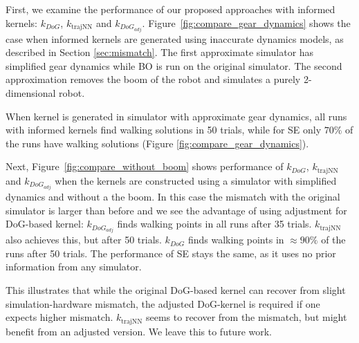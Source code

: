 First, we examine the performance of our proposed approaches with informed kernels: $k_{DoG}$, $k_{\text{trajNN}}$ and $k_{DoG_{adj}}$. Figure~\ref{fig:compare_gear_dynamics} shows the case when informed kernels are generated using inaccurate dynamics models, as described in Section \ref{sec:mismatch}. The first approximate simulator has simplified gear dynamics while BO is run on the original simulator. The second approximation removes the boom of the robot and simulates a purely 2-dimensional robot.

When kernel is generated in simulator with approximate gear dynamics, all runs with informed kernels find walking solutions in 50 trials, while for SE only $70\%$ of the runs have walking solutions (Figure \ref{fig:compare_gear_dynamics}).

Next, Figure~\ref{fig:compare_without_boom} shows performance of $k_{DoG}$, $k_{\text{trajNN}}$ and $k_{DoG_{adj}}$ when the kernels are constructed using a simulator with simplified dynamics and without a the boom. In this case the mismatch with the original simulator is larger than before and we see the advantage of using adjustment for DoG-based kernel: $k_{DoG_{adj}}$ finds walking points in all runs after 35 trials. $k_{\text{trajNN}}$ also achieves this, but after 50 trials. $k_{DoG}$ finds walking points in $\approx\!90\%$ of the runs after 50 trials. The performance of SE stays the same, as it uses no prior information from any simulator.

This illustrates that while the original DoG-based kernel can recover from slight simulation-hardware mismatch, the adjusted DoG-kernel is required if one expects higher mismatch.  $k_{\text{trajNN}}$ seems to recover from the mismatch, but might benefit from an adjusted version. We leave this to future work.

